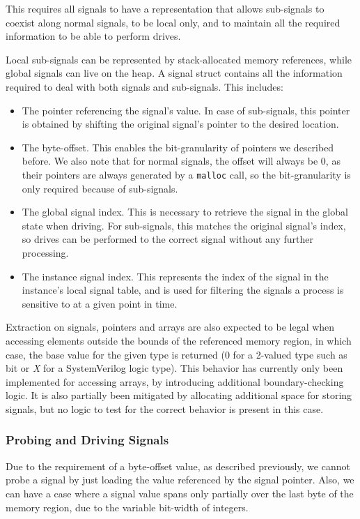 This requires all signals to have a representation that allows sub-signals to coexist along normal signals, to be local only, and to maintain all the required information to be able to perform drives.

Local sub-signals can be represented by stack-allocated memory references, while global signals can live on the heap. A signal struct contains all the information required to deal with both signals and sub-signals. This includes:

\begin{itemize}
    \item The pointer referencing the signal's value. In case of sub-signals, this pointer is obtained by shifting the original signal's pointer to the desired location.
    \item The byte-offset. This enables the bit-granularity of pointers we described before. We also note that for normal signals, the offset will always be $0$, as their pointers are always generated by a \texttt{malloc} call, so the bit-granularity is only required because of sub-signals.
    \item The global signal index. This is necessary to retrieve the signal in the global state when driving. For sub-signals, this matches the original signal's index, so drives can be performed to the correct signal without any further processing.
    \item The instance signal index. This represents the index of the signal in the instance's local signal table, and is used for filtering the signals a process is sensitive to at a given point in time.
\end{itemize}

Extraction on signals, pointers and arrays are also expected to be legal when accessing elements outside the bounds of the referenced memory region, in which case, the base value for the given type is returned (\ie $0$ for a 2-valued type such as bit or \textit{X} for a SystemVerilog logic type). This behavior has currently only been implemented for accessing arrays, by introducing additional boundary-checking logic. It is also partially been mitigated by allocating additional space for storing signals, but no logic to test for the correct behavior is present in this case.


\subsubsection{Probing and Driving Signals}
Due to the requirement of a byte-offset value, as described previously, we cannot probe a signal by just loading the value referenced by the signal pointer. Also, we can have a case where a signal value spans only partially over the last byte of the memory region, due to the variable bit-width of integers.

